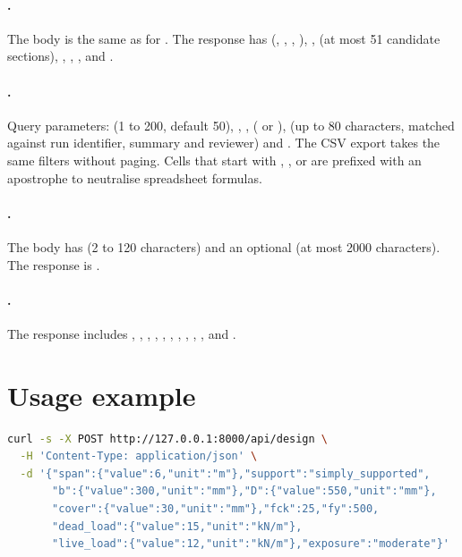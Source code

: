 \paragraph{.} The body is the same as for . The response has  (, , , ), ,  (at most 51 candidate sections), , , ,  and .
\paragraph{.} Query parameters:  (1 to 200, default 50), , ,  ( or ),  (up to 80 characters, matched against run identifier, summary and reviewer) and . The CSV export takes the same filters without paging. Cells that start with \code{=}, \code{+}, \code{-} or  are prefixed with an apostrophe to neutralise spreadsheet formulas.
\paragraph{.} The body has  (2 to 120 characters) and an optional  (at most 2000 characters). The response is .
\paragraph{.} The response includes , , , , , , , , , ,  and .

\section{Usage example}
\begin{lstlisting}[language=bash]
curl -s -X POST http://127.0.0.1:8000/api/design \
  -H 'Content-Type: application/json' \
  -d '{"span":{"value":6,"unit":"m"},"support":"simply_supported",
       "b":{"value":300,"unit":"mm"},"D":{"value":550,"unit":"mm"},
       "cover":{"value":30,"unit":"mm"},"fck":25,"fy":500,
       "dead_load":{"value":15,"unit":"kN/m"},
       "live_load":{"value":12,"unit":"kN/m"},"exposure":"moderate"}'
\end{lstlisting}
